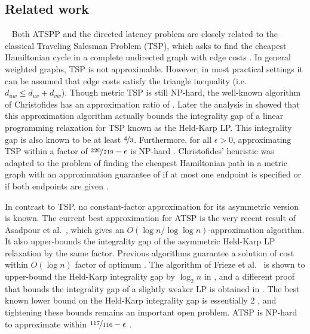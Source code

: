 \documentclass[11pt]{article}
\begin{document}
\subsection{Related work}~
Both ATSPP and the directed latency problem are closely
related to the classical Traveling Salesman Problem (TSP), 
which asks to find the cheapest Hamiltonian cycle in a complete undirected graph with edge costs \cite{lawler:lenstra,gutin}.
In general weighted graphs, TSP is not approximable. However, in most practical settings it can be assumed
that edge costs satisfy the triangle inequality
(i.e.\ $d_{uw} \leq d_{uv} + d_{vw}$).
Though metric TSP is still NP-hard, the well-known algorithm of 
Christofides \cite{christofides} has an approximation ratio of .
Later the analysis in \cite{shmoys:williamson,wolsey:heuristic} showed that this approximation algorithm actually bounds the integrality
gap of a linear programming relaxation for TSP known as the Held-Karp LP.
This integrality gap is also known to be 
at least $\nicefrac{4}{3}$.  Furthermore, for all
$\epsilon > 0$, approximating TSP within a factor of $\nicefrac{220}{219}-\epsilon$ is NP-hard \cite{papadimitriou:vempala}.
Christofides' heuristic was adapted to the problem of finding the cheapest Hamiltonian path
in a metric graph with an approximation guarantee of  if at most one endpoint is specified or  if both endpoints are given \cite{hoogeveen}.

In contrast to TSP, no constant-factor approximation for its asymmetric version is known. The current best approximation for ATSP is the very recent result of Asadpour et al.\ \cite{asadpour:atsp}, which gives an $O(\log n/ \log \log n)$-approximation algorithm. It also upper-bounds the integrality gap of the asymmetric Held-Karp LP relaxation by the same factor. 
Previous algorithms guarantee a solution of cost within  $O(\log n)$ factor 
of optimum \cite{frieze:galbiati,kleinberg:williamson,kaplan,feige:singh}. The 
algorithm of Frieze et al.\ \cite{frieze:galbiati} is shown to
upper-bound the  Held-Karp integrality gap by $\log_2n$ in \cite{williamson:msthesis}, and a different proof that bounds the integrality gap of a slightly weaker LP is obtained in 
\cite{nagarajan:ravi:polylog}. The best known lower bound on the Held-Karp integrality gap is essentially 2 \cite{charikar:goemans:karloff}, and tightening these bounds remains an important open problem. ATSP is NP-hard to approximate 
within $\nicefrac{117}{116} - \epsilon$ \cite{papadimitriou:vempala}.
\end{document}

